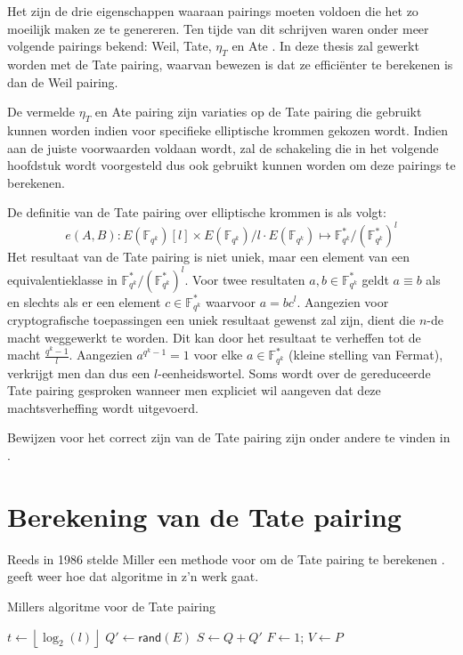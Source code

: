 Het zijn de drie eigenschappen waaraan pairings moeten voldoen die het zo moeilijk maken ze te genereren. Ten tijde van dit schrijven waren onder meer volgende pairings bekend: Weil, Tate, $\eta_T$ \cite{eta} en Ate \cite{ate}. In deze thesis zal gewerkt worden met de Tate pairing, waarvan bewezen is dat ze effici\"enter te berekenen is dan de Weil pairing.

De vermelde $\eta_T$ en Ate pairing zijn variaties op de Tate pairing die gebruikt kunnen worden indien voor specifieke elliptische krommen gekozen wordt. Indien aan de juiste voorwaarden voldaan wordt, zal de schakeling die in het volgende hoofdstuk wordt voorgesteld dus ook gebruikt kunnen worden om deze pairings te berekenen.

De definitie van de Tate pairing over elliptische krommen is als volgt:
\[e(A, B): E(\mathbb{F}_{q^k})[l] \times E(\mathbb{F}_{q^k})/l \cdot E(\mathbb{F}_{q^k}) \mapsto \mathbb{F}_{q^k}^* / (\mathbb{F}_{q^k}^*)^l\]
Het resultaat van de Tate pairing is niet uniek, maar een element van een equivalentieklasse in $\mathbb{F}_{q^k}^* / (\mathbb{F}_{q^k}^*)^l$. Voor twee resultaten $a, b \in \mathbb{F}_{q^k}^*$ geldt $a \equiv b$ als en slechts als er een element $c \in \mathbb{F}_{q^k}^*$ waarvoor $a = bc^l$. Aangezien voor cryptografische toepassingen een uniek resultaat gewenst zal zijn, dient die $n$-de macht weggewerkt te worden. Dit kan door het resultaat te verheffen tot de macht $\frac{q^k - 1 }{l}$. Aangezien $a^{q^k - 1} = 1$ voor elke $a \in \mathbb{F}_{q^k}^*$ (kleine stelling van Fermat), verkrijgt men dan dus een $l$-eenheidswortel. Soms wordt over de gereduceerde Tate pairing gesproken wanneer men expliciet wil aangeven dat deze machtsverheffing wordt uitgevoerd.

Bewijzen voor het correct zijn van de Tate pairing zijn onder andere te vinden in \cite{maas, maas27, maas28, maas34}.

\section{Berekening van de Tate pairing}

Reeds in 1986 stelde Miller een methode voor om de Tate pairing te berekenen \cite{miller, barreto-efficient}.  geeft weer hoe dat algoritme  in z'n werk gaat.

\begin{algorithm}[h]
	\caption{Millers algoritme voor de Tate pairing}
	\label{algoritme-pairings-miller}
	$t \gets \left\lfloor \log _2 (l) \right\rfloor$\;
	$Q' \gets \textsf{rand}(E)$\;
	$S \gets Q + Q'$\;
	$F \gets 1$; $V \gets P$\;	
\end{algorithm}
